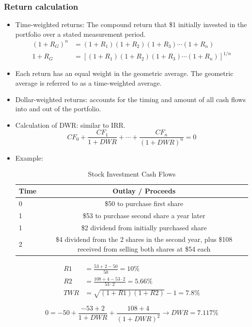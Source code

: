\subsubsection{Return calculation}
\begin{itemize}
\item Time-weighted returns: The compound return that \$1 initially invested in the portfolio over a stated measurement period.
\begin{align*}
(1 + R_G)^n &= (1 + R_1)(1 + R_2)(1 + R_3)\cdots(1 + R_n) \\
1 + R_G &= [(1 + R_1)(1 + R_2)(1 + R_3)\cdots(1 + R_n)]^{1/n}
\end{align*}
\item Each return has an equal weight in the geometric average. The geometric average is referred to as a time-weighted average.
\item Dollar-weighted returns: accounts for the timing and amount of all cash flows into and out of the portfolio.
\item Calculation of DWR: similar to IRR.
\[
CF_0 + \frac{CF_1}{1 + DWR} + \cdots + \frac{CF_n}{(1 + DWR)^n} = 0
\]
\item Example:

\begin{table}[h]
    \centering
    \caption{Stock Investment Cash Flows}
    \begin{tabular}{@{}lc@{}}

        Time & Outlay / Proceeds \\
        \midrule
        0 & \$50 to purchase first share \\
        1 & \$53 to purchase second share a year later \\
        1 & \$2 dividend from initially purchased share \\
        2 & \$4 dividend from the 2 shares in the second year, plus \$108 received from selling both shares at \$54 each \\
        \bottomrule
    \end{tabular}
\end{table}


\begin{align*}
R1 &= \frac{53 + 2 - 50}{50} = 10\% \\
R2 &= \frac{108 + 4 - 53 \cdot 2}{53 \cdot 2} = 5.66\% \\
TWR &= \sqrt{(1 + R1)(1 + R2)} - 1 = 7.8\%
\end{align*}

\[
0 = -50 + \frac{-53 + 2}{1 + DWR} + \frac{108 + 4}{(1 + DWR)^2} \rightarrow DWR = 7.117\%
\]



\end{itemize}
